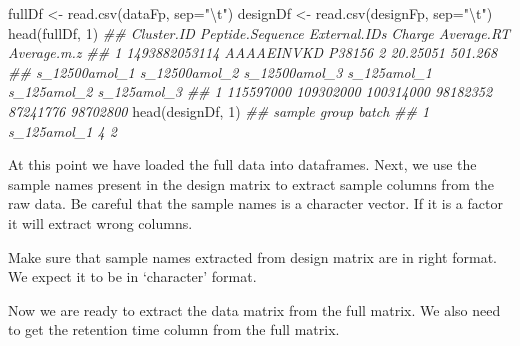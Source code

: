 \documentclass[]{article}
\newcommand{\hlnum}[1]{\textcolor[rgb]{0.816,0.125,0.439}{#1}}%
\newcommand{\hlstr}[1]{\textcolor[rgb]{0.251,0.627,0.251}{#1}}%
\newcommand{\hlcom}[1]{\textcolor[rgb]{0.502,0.502,0.502}{\textit{#1}}}%
\newcommand{\hlstd}[1]{\textcolor[rgb]{0.251,0.251,0.251}{#1}}%
\newenvironment{Shaded}{\begin{myshaded}}{\end{myshaded}}
\newcommand{\DecValTok}[1]{\hlnum{#1}}
\newcommand{\SpecialCharTok}[1]{\hlstr{#1}}
\newcommand{\StringTok}[1]{\hlstr{#1}}
\newcommand{\DocumentationTok}[1]{\hlcom{#1}}
\newcommand{\OtherTok}[1]{{#1}}
\newcommand{\FunctionTok}[1]{\hlstd{#1}}
\newcommand{\AttributeTok}[1]{{#1}}
\newcommand{\NormalTok}[1]{\hlstd{#1}}
\begin{document}
\begin{Shaded}
\begin{Highlighting}[]
\NormalTok{fullDf }\OtherTok{\textless{}{-}} \FunctionTok{read.csv}\NormalTok{(dataFp, }\AttributeTok{sep=}\StringTok{"}\SpecialCharTok{\textbackslash{}t}\StringTok{"}\NormalTok{)}
\NormalTok{designDf }\OtherTok{\textless{}{-}} \FunctionTok{read.csv}\NormalTok{(designFp, }\AttributeTok{sep=}\StringTok{"}\SpecialCharTok{\textbackslash{}t}\StringTok{"}\NormalTok{)}
\FunctionTok{head}\NormalTok{(fullDf, }\DecValTok{1}\NormalTok{)}
\DocumentationTok{\#\#      Cluster.ID Peptide.Sequence External.IDs Charge Average.RT Average.m.z}
\DocumentationTok{\#\# 1 1493882053114       AAAAEINVKD       P38156      2   20.25051     501.268}
\DocumentationTok{\#\#   s\_12500amol\_1 s\_12500amol\_2 s\_12500amol\_3 s\_125amol\_1 s\_125amol\_2 s\_125amol\_3}
\DocumentationTok{\#\# 1     115597000     109302000     100314000    98182352    87241776    98702800}
\FunctionTok{head}\NormalTok{(designDf, }\DecValTok{1}\NormalTok{)}
\DocumentationTok{\#\#        sample group batch}
\DocumentationTok{\#\# 1 s\_125amol\_1     4     2}
\end{Highlighting}
\end{Shaded}

At this point we have loaded the full data into dataframes. Next, we use the sample names present in the design matrix to extract sample columns from the raw data. Be careful that the sample names is a character vector. If it is a factor it will extract wrong columns.

Make sure that sample names extracted from design matrix are in right format. We expect it to be in `character' format.

\begin{Shaded}
\end{Shaded}

Now we are ready to extract the data matrix from the full matrix. We also need to get the retention time column from the full matrix.

\begin{Shaded}
\end{Shaded}
\end{document}
